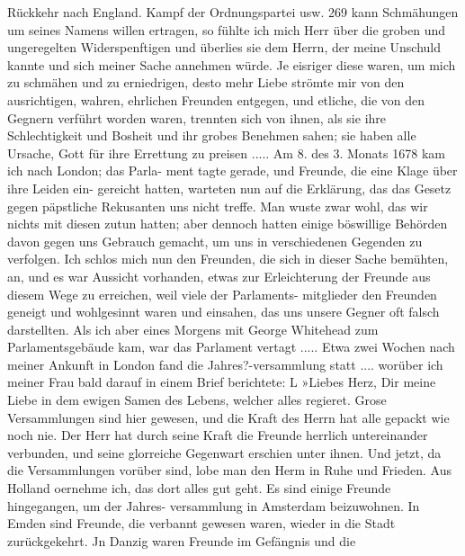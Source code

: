 Rückkehr nach England. Kampf der Ordnungspartei usw. 269
kann Schmähungen um seines Namens willen ertragen, so fühlte
ich mich Herr über die groben und ungeregelten Widerspenftigen
und überlies sie dem Herrn, der meine Unschuld kannte und sich
meiner Sache annehmen würde. Je eisriger diese waren, um
mich zu schmähen und zu erniedrigen, desto mehr Liebe strömte
mir von den ausrichtigen, wahren, ehrlichen Freunden entgegen,
und etliche, die von den Gegnern verführt worden waren, trennten
sich von ihnen, als sie ihre Schlechtigkeit und Bosheit und ihr
grobes Benehmen sahen; sie haben alle Ursache, Gott für ihre
Errettung zu preisen .....
Am 8. des 3. Monats 1678 kam ich nach London; das Parla-
ment tagte gerade, und Freunde, die eine Klage über ihre Leiden ein-
gereicht hatten, warteten nun auf die Erklärung, das das Gesetz
gegen päpstliche Rekusanten uns nicht treffe. Man wuste zwar
wohl, das wir nichts mit diesen zutun hatten; aber dennoch
hatten einige böswillige Behörden davon gegen uns Gebrauch
gemacht, um uns in verschiedenen Gegenden zu verfolgen. Ich
schlos mich nun den Freunden, die sich in dieser Sache bemühten,
an, und es war Aussicht vorhanden, etwas zur Erleichterung der
Freunde aus diesem Wege zu erreichen, weil viele der Parlaments-
mitglieder den Freunden geneigt und wohlgesinnt waren und
einsahen, das uns unsere Gegner oft falsch darstellten. Als ich
aber eines Morgens mit George Whitehead zum Parlamentsgebäude
kam, war das Parlament vertagt .....
Etwa zwei Wochen nach meiner Ankunft in London fand
die Jahres?-versammlung statt .... worüber ich meiner Frau
bald darauf in einem Brief berichtete: L
»Liebes Herz,
Dir meine Liebe in dem ewigen Samen des Lebens, welcher
alles regieret. Grose Versammlungen sind hier gewesen, und die
Kraft des Herrn hat alle gepackt wie noch nie. Der Herr hat
durch seine Kraft die Freunde herrlich untereinander verbunden,
und seine glorreiche Gegenwart erschien unter ihnen. Und jetzt,
da die Versammlungen vorüber sind, lobe man den Herm in
Ruhe und Frieden. Aus Holland oernehme ich, das dort alles
gut geht. Es sind einige Freunde hingegangen, um der Jahres-
versammlung in Amsterdam beizuwohnen. In Emden sind
Freunde, die verbannt gewesen waren, wieder in die Stadt
zurückgekehrt. Jn Danzig waren Freunde im Gefängnis und die

